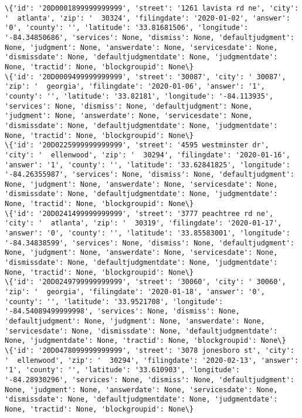 \documentclass[11pt]{article}
\begin{document}
\begin{Verbatim}[commandchars=\\\{\}]
\{'id': '20D0001899999999999', 'street': '1261 lavista rd ne', 'city': '  atlanta', 'zip': '  30324', 'filingdate': '2020-01-02', 'answer': '0', 'county': '', 'latitude': '33.81681506', 'longitude': '-84.34850686', 'services': None, 'dismiss': None, 'defaultjudgment': None, 'judgment': None, 'answerdate': None, 'servicesdate': None, 'dismissdate': None, 'defaultjudgmentdate': None, 'judgmentdate': None, 'tractid': None, 'blockgroupid': None\}
\{'id': '20D0009499999999999', 'street': '30087', 'city': ' 30087', 'zip': '  georgia', 'filingdate': '2020-01-06', 'answer': '1', 'county': '', 'latitude': '33.82181', 'longitude': '-84.113935', 'services': None, 'dismiss': None, 'defaultjudgment': None, 'judgment': None, 'answerdate': None, 'servicesdate': None, 'dismissdate': None, 'defaultjudgmentdate': None, 'judgmentdate': None, 'tractid': None, 'blockgroupid': None\}
\{'id': '20D0225999999999999', 'street': '4595 westminster dr', 'city': '  ellenwood', 'zip': '  30294', 'filingdate': '2020-01-16', 'answer': '1', 'county': '', 'latitude': '33.62841825', 'longitude': '-84.26355987', 'services': None, 'dismiss': None, 'defaultjudgment': None, 'judgment': None, 'answerdate': None, 'servicesdate': None, 'dismissdate': None, 'defaultjudgmentdate': None, 'judgmentdate': None, 'tractid': None, 'blockgroupid': None\}
\{'id': '20D0241499999999999', 'street': '3777 peachtree rd ne', 'city': '  atlanta', 'zip': '  30319', 'filingdate': '2020-01-17', 'answer': '0', 'county': '', 'latitude': '33.85583001', 'longitude': '-84.34838599', 'services': None, 'dismiss': None, 'defaultjudgment': None, 'judgment': None, 'answerdate': None, 'servicesdate': None, 'dismissdate': None, 'defaultjudgmentdate': None, 'judgmentdate': None, 'tractid': None, 'blockgroupid': None\}
\{'id': '20D0249799999999999', 'street': '30060', 'city': ' 30060', 'zip': '  georgia', 'filingdate': '2020-01-18', 'answer': '0', 'county': '', 'latitude': '33.9521708', 'longitude': '-84.54089499999998', 'services': None, 'dismiss': None, 'defaultjudgment': None, 'judgment': None, 'answerdate': None, 'servicesdate': None, 'dismissdate': None, 'defaultjudgmentdate': None, 'judgmentdate': None, 'tractid': None, 'blockgroupid': None\}
\{'id': '20D0478099999999999', 'street': '3078 jonesboro st', 'city': '  ellenwood', 'zip': '  30294', 'filingdate': '2020-02-13', 'answer': '1', 'county': '', 'latitude': '33.610903', 'longitude': '-84.28930296', 'services': None, 'dismiss': None, 'defaultjudgment': None, 'judgment': None, 'answerdate': None, 'servicesdate': None, 'dismissdate': None, 'defaultjudgmentdate': None, 'judgmentdate': None, 'tractid': None, 'blockgroupid': None\}

\end{Verbatim}
\end{document}
